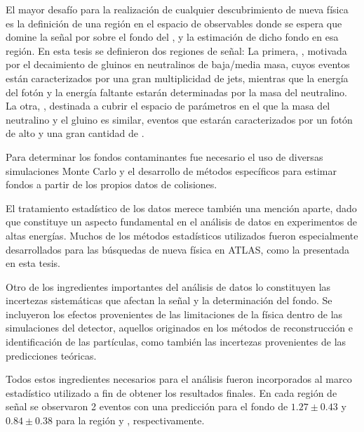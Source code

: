 
El mayor desafío para la realización de cualquier descubrimiento de nueva física
es la definición de una región en el espacio de observables donde se espera que
domine la señal por sobre el fondo del {\SM}, y la estimación de dicho fondo en
esa región. En esta tesis se definieron dos regiones de señal: La primera,
{\SRL}, motivada por el decaimiento de gluinos en neutralinos de baja/media
masa, cuyos eventos están caracterizados por una gran multiplicidad de jets,
mientras que la energía del fotón y la energía faltante estarán determinadas por
la masa del neutralino. La otra, {\SRH}, destinada a cubrir el espacio de
parámetros en el que la masa del neutralino y el gluino es similar, eventos que
estarán caracterizados por un fotón de alto {\pt} y una gran cantidad de {\met}.

Para determinar los fondos contaminantes fue necesario el uso de diversas
simulaciones Monte Carlo y el desarrollo de métodos específicos para estimar fondos a
partir de los propios datos de colisiones.

El tratamiento estadístico de los datos merece también una mención aparte, dado
que constituye un aspecto fundamental en el análisis de datos en experimentos de
altas energías. Muchos de los métodos estadísticos utilizados fueron
especialmente desarrollados para las búsquedas de nueva física en ATLAS, como la
presentada en esta tesis.

Otro de los ingredientes importantes del análisis de datos lo constituyen las
incertezas sistemáticas que afectan la señal y la determinación del fondo. Se
incluyeron los efectos provenientes de las limitaciones de la física dentro de
las simulaciones del detector, aquellos originados en los métodos de
reconstrucción e identificación de las partículas, como también las incertezas
provenientes de las predicciones teóricas.

Todos estos ingredientes necesarios para el análisis fueron incorporados al
marco estadístico utilizado a fin de obtener los resultados finales. En cada
región de señal se observaron 2 eventos con una predicción para el fondo de
$1.27\pm0.43$ y $0.84\pm 0.38$ para la región {\SRL} y {\SRH}, respectivamente.


